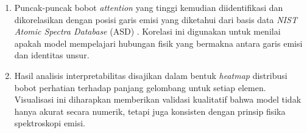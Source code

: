 \begin{enumerate}
    \item Puncak-puncak bobot \textit{attention} yang tinggi kemudian diidentifikasi dan dikorelasikan dengan posisi garis emisi yang diketahui dari basis data \textit{NIST Atomic Spectra Database} (ASD) \citep{kramida_nist_2024}. Korelasi ini digunakan untuk menilai apakah model mempelajari hubungan fisik yang bermakna antara garis emisi dan identitas unsur.

    \item Hasil analisis interpretabilitas disajikan dalam bentuk \textit{heatmap} distribusi bobot perhatian terhadap panjang gelombang untuk setiap elemen. Visualisasi ini diharapkan memberikan validasi kualitatif bahwa model tidak hanya akurat secara numerik, tetapi juga konsisten dengan prinsip fisika spektroskopi emisi.
\end{enumerate}

